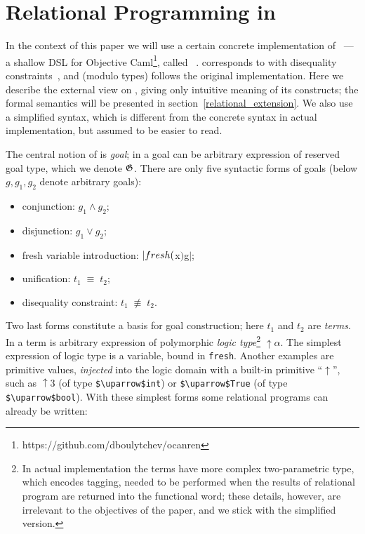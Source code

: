 \section{Relational Programming in \miniKanren}
\label{ocanren}

In the context of this paper we will use a certain concrete implementation of ~--- a shallow DSL for Objective 
Caml\footnote{https://github.com/dboulytchev/ocanren}, called \ocanren~\cite{ocanren}. \ocanren corresponds to \miniKanren with
disequality constraints~\cite{CKanren}, and (modulo types) follows the original implementation. Here we describe the external view 
on \ocanren, giving only intuitive meaning of its constructs; the formal semantics will be presented in section~\ref{relational_extension}.
We also use a simplified syntax, which is different from the concrete syntax in actual implementation, but assumed to
be easier to read.

The central notion of \miniKanren is \emph{goal}; in \ocanren a goal can be arbitrary expression of reserved goal type, which we denote $\mathfrak G$.
There are only five syntactic forms of goals (below $g, g_1, g_2$ denote arbitrary goals):

\begin{itemize}
  \item conjunction: $g_1\wedge g_2$;
  \item disjunction: $g_1\vee g_2$;
  \item fresh variable introduction: $\lstinline|fresh ($x$) $\;g$|$;
  \item unification: $t_1\;\equiv\;t_2$;
  \item disequality constraint: $t_1\;\not\equiv\;t_2$.
\end{itemize}

Two last forms constitute a basis for goal construction; here $t_1$ and $t_2$ are \emph{terms}. In \ocanren a term is
arbitrary expression of polymorphic \emph{logic type}\footnote{In actual 
implementation the terms have more complex two-parametric type, which encodes tagging, needed to be performed when the results of
relational program are returned into the functional word; these details, however, are irrelevant to the objectives of the paper, and we stick with the 
simplified version.} $\uparrow\!\alpha$. The simplest expression of logic type is a variable, bound in \lstinline|fresh|. Another examples are primitive values, \emph{injected} 
into the logic domain with a built-in primitive ``$\uparrow$'', such as $\uparrow\!3$ (of type \lstinline|$\uparrow$int|) or \lstinline|$\uparrow$True| 
(of type \lstinline|$\uparrow$bool|). With these simplest forms some relational programs can already be written:

